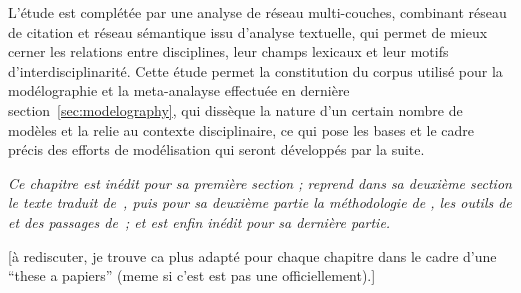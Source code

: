 L'étude est complétée par une analyse de réseau multi-couches, combinant réseau de citation et réseau sémantique issu d'analyse textuelle, qui permet de mieux cerner les relations entre disciplines, leur champs lexicaux et leur motifs d'interdisciplinarité. Cette étude permet la constitution du corpus utilisé pour la modélographie et la meta-analayse effectuée en dernière section~\ref{sec:modelography}, qui dissèque la nature d'un certain nombre de modèles et la relie au contexte disciplinaire, ce qui pose les bases et le cadre précis des efforts de modélisation qui seront développés par la suite.






\stars


\textit{Ce chapitre est inédit pour sa première section ; reprend dans sa deuxième section le texte traduit de~\cite{raimbault2015models}, puis pour sa deuxième partie la méthodologie de \cite{raimbault2016indirect}, les outils de \cite{bergeaud2017classifying} et des passages de~\cite{}; et est enfin inédit pour sa dernière partie.}

[à rediscuter, je trouve ca plus adapté pour chaque chapitre dans le cadre d'une ``these a papiers'' (meme si c'est est pas une officiellement).]






